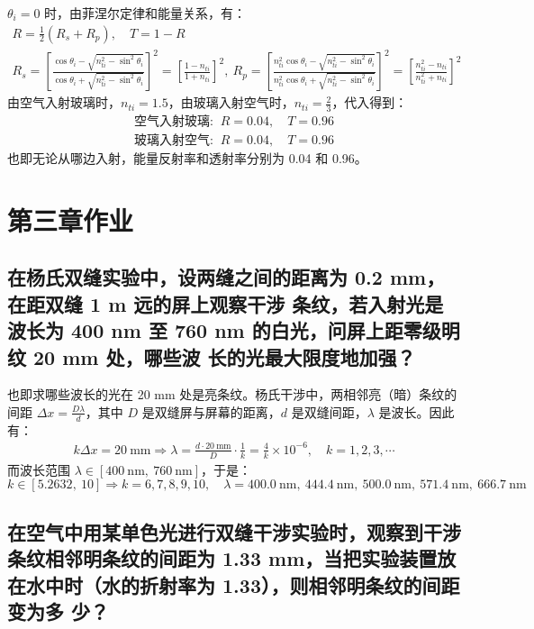 \documentclass[UTF8]{report}
\theoremstyle{MyLineTheoremStyle} %
\theoremstyle{MyBlockTheoremStyle} %
\theoremstyle{MySubsubsectionStyle} %
\begin{document}
$\theta_i = 0$ 时，由菲涅尔定律和能量关系，有：
\begin{gather}
    R =  \frac{1}{2}(R_s + R_p),\quad  T = 1 - R\\ 
    R_s =  \left[ \frac{ \cos \theta_i - \sqrt{n_{ti}^2 - \sin^2 \theta_i} }{\cos \theta_i + \sqrt{n_{ti}^2 - \sin^2 \theta_i}} \right]^2 = \left[ \frac{1 - n_{ti}}{1 + n_{ti}} \right]^2,\ R_p = \left[ \frac{ n_{ti}^2\cos \theta_i - \sqrt{n_{ti}^2 - \sin^2 \theta_i} }{n_{ti}^2\cos \theta_i + \sqrt{n_{ti}^2 - \sin^2 \theta_i}} \right]^2 =  \left[ \frac{n_{ti}^2 - n_{ti}}{n_{ti}^2 + n_{ti}} \right]^2
\end{gather}
由空气入射玻璃时，$n_{ti} = 1.5$，由玻璃入射空气时，$n_{ti} = \frac{2}{3}$，代入得到：
\begin{gather*}
\text{空气入射玻璃: }\ R = 0.04,\quad  T = 0.96 \\ 
\text{玻璃入射空气: }\ R = 0.04,\quad  T = 0.96 
\end{gather*}
也即无论从哪边入射，能量反射率和透射率分别为 0.04 和 0.96。


\chapter{第三章作业}\thispagestyle{fancy}

\section{在杨氏双缝实验中，设两缝之间的距离为 0.2 mm，在距双缝 1 m 远的屏上观察干涉
条纹，若入射光是波长为 400 nm 至 760 nm 的白光，问屏上距零级明纹 20 mm 处，哪些波
长的光最大限度地加强？}

也即求哪些波长的光在 20 mm 处是亮条纹。杨氏干涉中，两相邻亮（暗）条纹的间距 $\Delta x = \frac{D \lambda}{d}$，其中 $D$ 是双缝屏与屏幕的距离，$d$ 是双缝间距，$\lambda$ 是波长。因此有：
\begin{gather}
k \Delta x = 20 \ \mathrm{mm} \Longrightarrow \lambda = \frac{d\cdot 20 \ \mathrm{mm}}{D} \cdot \frac{1 }{k} = \frac{4}{k}\times 10^{-6},\quad k = 1,2,3,\cdots
\end{gather}
而波长范围 $\lambda \in [400 \ \mathrm{nm} ,\ 760 \ \mathrm{nm}]$，于是：
\begin{equation}
k \in [5.2632,\ 10] \Longrightarrow k = 6,7,8,9,10 ,\quad \lambda = 400.0 \ \mathrm{nm},\ 444.4 \ \mathrm{nm},\ 500.0 \ \mathrm{nm},\ 571.4 \ \mathrm{nm},\ 666.7 \ \mathrm{nm}
\end{equation}

\section{在空气中用某单色光进行双缝干涉实验时，观察到干涉条纹相邻明条纹的间距为
1.33 mm，当把实验装置放在水中时（水的折射率为 1.33），则相邻明条纹的间距变为多
少？}
\end{document}

